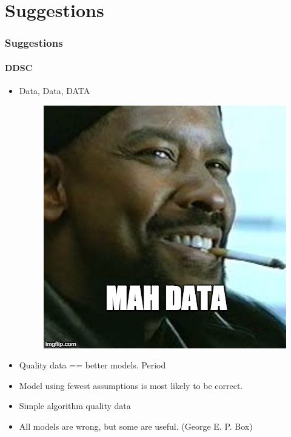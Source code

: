 \documentclass[gray]{beamer}
\begin{document}
\section{Suggestions}
\begin{frame}
\frametitle{Suggestions}
\framesubtitle{DDSC}
\begin{itemize}
\item{Data, Data, DATA}
	\begin{figure}
		\includegraphics[scale=.3]{./figures/mydata}
	\end{figure}
\item{Quality data == better models. Period}
\item{Model using fewest assumptions is most likely to be correct.}
\item{Simple algorithm quality data}
\item{All models are wrong, but some are useful. (George E. P. Box)}
\end{itemize}
\end{frame}

\end{document}
